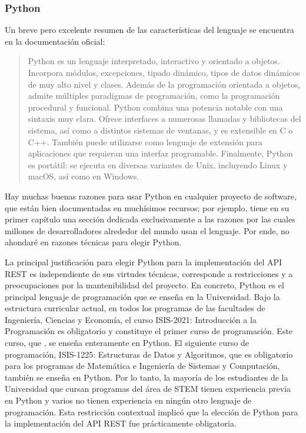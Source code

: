 \subsubsection{Python}

Un breve pero excelente resumen de las características del lenguaje se encuentra en la documentación oficial:
\begin{quote}
	Python es un lenguaje interpretado, interactivo y orientado a objetos. Incorpora módulos, excepciones, tipado dinámico, tipos de datos dinámicos de muy alto nivel y clases. Además de la programación orientada a objetos, admite múltiples paradigmas de programación, como la programación procedural y funcional. Python combina una potencia notable con una sintaxis muy clara. Ofrece interfaces a numerosas llamadas y bibliotecas del sistema, así como a distintos sistemas de ventanas, y es extensible en C o C++. También puede utilizarse como lenguaje de extensión para aplicaciones que requieran una interfaz programable. Finalmente, Python es portátil: se ejecuta en diversas variantes de Unix, incluyendo Linux y macOS, así como en Windows. \cite{python_official_docs}
\end{quote} %
\noindent Hay muchas buenas razones para usar Python en cualquier proyecto de software, que están bien documentadas en muchísimos recursos; por ejemplo, \cite{learning_python} tiene en su primer capítulo una sección dedicada exclusivamente a las razones por las cuales millones de desarrolladores alrededor del mundo usan el lenguaje. Por ende, no ahondaré en razones técnicas para elegir Python.

La principal justificación para elegir Python para la implementación del API REST es independiente de sus virtudes técnicas, corresponde a restricciones y a preocupaciones por la mantenibilidad del proyecto. En concreto, Python es el principal lenguaje de programación que se enseña en la Universidad. Bajo la estructura curricular actual, en todos los programas de las facultades de Ingeniería, Ciencias y Economía, el curso ISIS-2021: Introducción a la Programación es obligatorio y constituye el primer curso de programación. %
Este curso, que  \cite{ip}, se enseña enteramente en Python. El siguiente curso de programación, ISIS-1225: Estructuras de Datos y Algoritmos, que es obligatorio para los programas de Matemática e Ingeniería de Sistemas y Computación, también se enseña en Python. %
Por lo tanto, la mayoría de los estudiantes de la Universidad que cursan programas del área de STEM tienen experiencia previa en Python y varios no tienen experiencia en ningún otro lenguaje de programación. Esta restricción contextual implicó que la elección de Python para la implementación del API REST fue prácticamente obligatoria.

